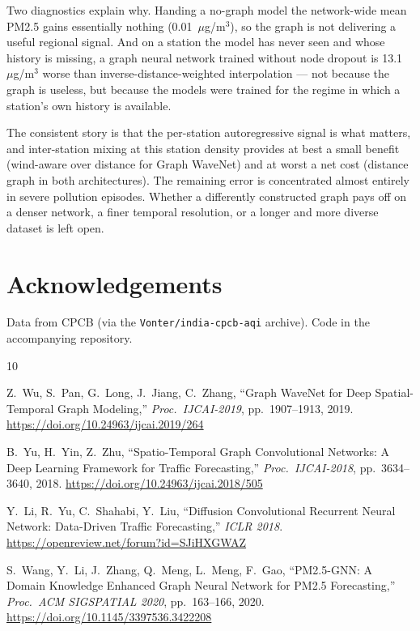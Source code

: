 \documentclass[11pt,a4paper]{article}
\begin{document}
Two diagnostics explain why.  Handing a no-graph model the network-wide mean
PM2.5 gains essentially nothing (0.01~$\mu$g/m$^3$), so the graph is not
delivering a useful regional signal.  And on a station the model has never seen
and whose history is missing, a graph neural network trained without node
dropout is 13.1~$\mu$g/m$^3$ worse than inverse-distance-weighted interpolation
--- not because the graph is useless, but because the models were trained for
the regime in which a station's own history is available.

The consistent story is that the per-station autoregressive signal is what
matters, and inter-station mixing at this station density provides at best a
small benefit (wind-aware over distance for Graph WaveNet) and at worst a net
cost (distance graph in both architectures).  The remaining error is
concentrated almost entirely in severe pollution episodes.  Whether a
differently constructed graph pays off on a denser network, a finer temporal
resolution, or a longer and more diverse dataset is left open.

\section*{Acknowledgements}
Data from CPCB (via the \texttt{Vonter/india-cpcb-aqi} archive).
Code in the accompanying repository.

\begin{thebibliography}{10}

Z.~Wu, S.~Pan, G.~Long, J.~Jiang, C.~Zhang,
``Graph WaveNet for Deep Spatial-Temporal Graph Modeling,''
\textit{Proc.\ IJCAI-2019}, pp.\ 1907--1913, 2019.
\url{https://doi.org/10.24963/ijcai.2019/264}

B.~Yu, H.~Yin, Z.~Zhu,
``Spatio-Temporal Graph Convolutional Networks: A Deep Learning Framework
for Traffic Forecasting,''
\textit{Proc.\ IJCAI-2018}, pp.\ 3634--3640, 2018.
\url{https://doi.org/10.24963/ijcai.2018/505}

Y.~Li, R.~Yu, C.~Shahabi, Y.~Liu,
``Diffusion Convolutional Recurrent Neural Network: Data-Driven Traffic
Forecasting,''
\textit{ICLR 2018}.
\url{https://openreview.net/forum?id=SJiHXGWAZ}

S.~Wang, Y.~Li, J.~Zhang, Q.~Meng, L.~Meng, F.~Gao,
``PM2.5-GNN: A Domain Knowledge Enhanced Graph Neural Network for PM2.5
Forecasting,''
\textit{Proc.\ ACM SIGSPATIAL 2020}, pp.\ 163--166, 2020.
\url{https://doi.org/10.1145/3397536.3422208}

\end{thebibliography}
\end{document}
